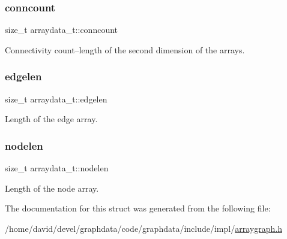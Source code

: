 \subsubsection{\texorpdfstring{conncount}{conncount}}
{\footnotesize\ttfamily size\+\_\+t arraydata\+\_\+t\+::conncount}



Connectivity count--length of the second dimension of the arrays. 

\mbox{\label{structarraydata__t_a1bcdcd2b541e02eb0d20be0563a1f447}} 
\subsubsection{\texorpdfstring{edgelen}{edgelen}}
{\footnotesize\ttfamily size\+\_\+t arraydata\+\_\+t\+::edgelen}



Length of the edge array. 

\mbox{\label{structarraydata__t_ab7b4b6740dd5353c323233dea2e2eaee}} 
\subsubsection{\texorpdfstring{nodelen}{nodelen}}
{\footnotesize\ttfamily size\+\_\+t arraydata\+\_\+t\+::nodelen}



Length of the node array. 



The documentation for this struct was generated from the following file\+:\begin{DoxyCompactItemize}
\item 
/home/david/devel/graphdata/code/graphdata/include/impl/\hyperlink{arraygraph_8h}{arraygraph.\+h}\end{DoxyCompactItemize}
